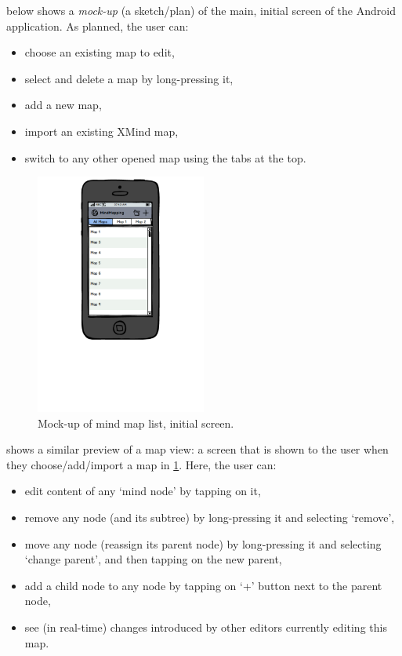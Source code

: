  below shows a \emph{mock-up} (a sketch/plan) of the main, initial screen of the Android application. As planned, the user can:

\begin{itemize}
	\item choose an existing map to edit,
	\item select and delete a map by long-pressing it,
	\item add a new map,
	\item import an existing XMind map,
	\item switch to any other opened map using the tabs at the top.
\end{itemize}

\begin{figure}[h]
	\centering
	\includegraphics[width=0.5\textwidth]{graphics-mockup-list}
	\caption{Mock-up of mind map list, initial screen.}
	\label{fig:mockup-maplist}
\end{figure}

 shows a similar preview of a map view: a screen that is shown to the user when they choose/add/import a map in \cref{fig:mockup-maplist}. Here, the user can:

\begin{itemize}
	\item edit content of any `mind node' by tapping on it,
	\item remove any node (and its subtree) by long-pressing it and selecting `remove',
	\item move any node (reassign its parent node) by long-pressing it and selecting `change parent', and then tapping on the new parent,
	\item add a child node to any node by tapping on `+' button next to the parent node,
	\item see (in real-time) changes introduced by other editors currently editing this map.
\end{itemize}


